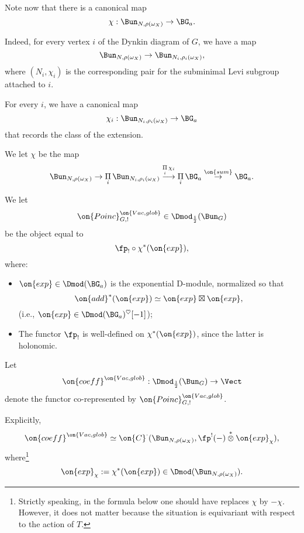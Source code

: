 \documentclass[9pt]{amsart}
\theoremstyle{remark}
\theoremstyle{definition}
\theoremstyle{remark}
\numberwithin{equation}{section}
\begin{document}
\sssec{}

Note now that there is a canonical map
$$\chi:\Bun_{N,\rho(\omega_X)}\to \BG_a.$$

Indeed, for every vertex $i$ of the Dynkin diagram of $G$, we have a map
$$\Bun_{N,\rho(\omega_X)}\to \Bun_{N_i,\rho_i(\omega_X)},$$
where $(N_i,\chi_i)$ is the corresponding pair for the subminimal Levi subgroup attached to $i$. 

\medskip

For every $i$, we have a canonical map 
$$\chi_i:\Bun_{N_i,\rho_i(\omega_X)}\to \BG_a$$
that records the class of the extension.

\medskip

We let $\chi$ be the map
$$\Bun_{N,\rho(\omega_X)} \to \underset{i}\Pi\, \Bun_{N_i,\rho_i(\omega_X)} \overset{\underset{i}\Pi\, \chi_i}\longrightarrow
\underset{i}\Pi\, \BG_a \overset{\on{sum}}\to \BG_a.$$

\sssec{}

We let 
$$\on{Poinc}^{\on{Vac,glob}}_{G,!}\in  \Dmod_{\frac{1}{2}}(\Bun_G)$$
be the object equal to 
$$\fp_!\circ \chi^*(\on{exp}),$$
where:

\begin{itemize}

\item $\on{exp}\in \Dmod(\BG_a)$ is the exponential D-module, normalized so that
$$\on{add}^*(\on{exp})\simeq \on{exp}\boxtimes \on{exp},$$
(i.e., $\on{exp}\in \Dmod(\BG_a)^\heartsuit[-1]$);

\medskip

\item The functor $\fp_!$ is well-defined on $\chi^*(\on{exp})$, since the latter is holonomic.

\end{itemize} 

\sssec{} \label{sss:coeff}

Let 
$$\on{coeff}^{\on{Vac,glob}}:\Dmod_{\frac{1}{2}}(\Bun_G)\to \Vect$$
denote the functor co-represented by $\on{Poinc}^{\on{Vac,glob}}_{G,!}$.

\medskip

Explicitly,
$$\on{coeff}^{\on{Vac,glob}}\simeq \on{C}^\cdot(\Bun_{N,\rho(\omega_X)},\fp^!(-)\overset{*}\otimes \on{exp}_\chi),$$
where\footnote{Strictly speaking, in the formula below one should have replaces $\chi$ by $-\chi$. However, it does not matter
because the situation is equivariant with respect to the action of $T$.}
$$\on{exp}_\chi:=\chi^*(\on{exp})\in \Dmod(\Bun_{N,\rho(\omega_X)}).$$
\end{document}
